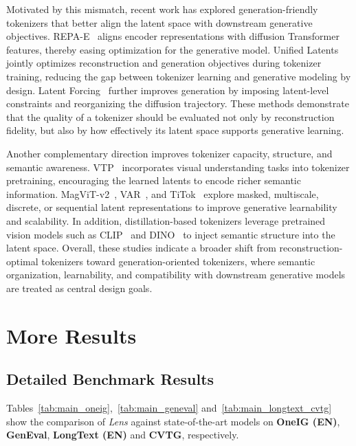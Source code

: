Motivated by this mismatch, recent work has explored generation-friendly tokenizers that better align the latent space with downstream generative objectives. REPA-E~\citep{leng2025repae} aligns encoder representations with diffusion Transformer features, thereby easing optimization for the generative model. Unified Latents~\citep{hu2024unifiedlatents} jointly optimizes reconstruction and generation objectives during tokenizer training, reducing the gap between tokenizer learning and generative modeling by design. Latent Forcing~\citep{tu2024latentforcing} further improves generation by imposing latent-level constraints and reorganizing the diffusion trajectory. These methods demonstrate that the quality of a tokenizer should be evaluated not only by reconstruction fidelity, but also by how effectively its latent space supports generative learning.

Another complementary direction improves tokenizer capacity, structure, and semantic awareness. VTP~\citep{vtp} incorporates visual understanding tasks into tokenizer pretraining, encouraging the learned latents to encode richer semantic information. MagViT-v2~\citep{yu2023magvitv2}, VAR~\citep{tian2024visual}, and TiTok~\citep{yu2024titok} explore masked, multiscale, discrete, or sequential latent representations to improve generative learnability and scalability. In addition, distillation-based tokenizers leverage pretrained vision models such as CLIP~\citep{radford2021clip} and DINO~\citep{cijosevic2021dino} to inject semantic structure into the latent space. Overall, these studies indicate a broader shift from reconstruction-optimal tokenizers toward generation-oriented tokenizers, where semantic organization, learnability, and compatibility with downstream generative models are treated as central design goals.

\section{More Results}
\label{sec:detailed-results}





\subsection{Detailed Benchmark Results}
\label{sec:benchmark-details}


Tables~\ref{tab:main_oneig},~\ref{tab:main_geneval} and~\ref{tab:main_longtext_cvtg} show the comparison of \textit{Lens} against state-of-the-art models on \textbf{OneIG (EN)}, \textbf{GenEval}, \textbf{LongText (EN)} and \textbf{CVTG}, respectively.


